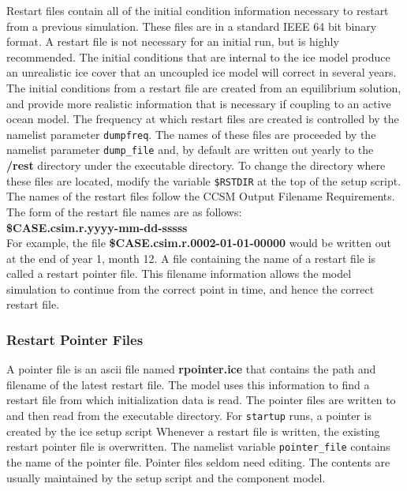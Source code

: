 
Restart files contain all of the initial condition information
necessary to restart from a previous simulation.  These files are in a
standard IEEE 64 bit binary format. A restart file is not necessary for
an initial run, but is highly recommended.  The initial conditions
that are internal to the ice model produce an unrealistic ice cover
that an uncoupled ice model will correct in several years.  The initial
conditions from a restart file are created from an equilibrium solution,
and provide more realistic information that is necessary if coupling
to an active ocean model.  The frequency at which restart files are created
is controlled by the namelist parameter {\tt dumpfreq}. 
The names of these files are proceeded by the namelist parameter 
{\tt dump\_file} and, by default are written out yearly to the {\bf /rest}
directory under the executable directory.  To change the directory where these files are
located, modify the variable {\tt \$RSTDIR} at the top of the setup script.
The names of the restart files follow the CCSM Output Filename Requirements.
The form of the restart file names are as follows: \\

{\bf \$CASE.csim.r.yyyy-mm-dd-sssss} \\

For example, the file {\bf \$CASE.csim.r.0002-01-01-00000} would be written
out at the end of year 1, month 12.  A file containing the name of a restart
file is called a restart pointer file. This filename information allows the
model simulation to continue from the correct point in time, and hence the
correct restart file.

\subsubsection*{Restart Pointer Files}
\label{pointer_files}

A pointer file is an ascii file named {\bf rpointer.ice} that contains the
path and filename of the latest restart file. The model uses this information to find
a restart file from which initialization data is read.  The pointer files are
written to and then read from the executable directory. For 
{\tt startup} runs, a pointer is created by the ice setup script 
Whenever a restart file is written, the existing restart pointer file 
is overwritten.  The namelist variable {\tt pointer\_file} contains the
name of the pointer file. Pointer files seldom need editing.  The contents
are usually maintained by the setup script and the component model. 

